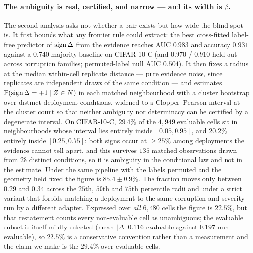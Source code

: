 \paragraph{The ambiguity is real, certified, and narrow --- and its width is $\beta$.} The second
analysis asks not whether a pair exists but how wide the blind spot is. It first bounds what any
frontier rule could extract: the best cross-fitted label-free predictor of $\operatorname{sign}\Delta$ from the
evidence reaches AUC $0.983$ and accuracy $0.931$ against a $0.740$ majority baseline on CIFAR-10-C
(and $0.970$ / $0.910$ held out across corruption families; permuted-label null AUC $0.504$). It
then fixes a radius at the median within-cell replicate distance --- pure evidence noise, since
replicates are independent draws of the same condition --- and estimates
$\mathbb{P}(\operatorname{sign}\Delta={+}1\mid Z\in N)$ in each matched neighbourhood with a cluster bootstrap over
distinct deployment conditions, widened to a Clopper--Pearson interval at the cluster count so that
neither ambiguity nor determinacy can be certified by a degenerate interval. On CIFAR-10-C,
$29.4\%$ of the $4{,}949$ evaluable cells sit in neighbourhoods whose
interval lies entirely inside $[0.05,0.95]$, and $20.2\%$ entirely inside $[0.25,0.75]$: both signs
occur at $\ge25\%$ among deployments the evidence cannot tell apart, and this survives $135$ matched
observations drawn from $28$ distinct conditions, so it is ambiguity in the conditional law and not
in the estimate. Under the same pipeline with the labels permuted and the geometry held fixed the
figure is $85.4\pm0.9\%$. The fraction moves only between $0.29$ and $0.34$ across the $25$th,
$50$th and $75$th percentile radii and under a strict variant that forbids matching a deployment to
the same corruption and severity run by a different adapter. Expressed over \emph{all} $6{,}480$
cells the figure is $22.5\%$, but that restatement counts every non-evaluable cell as unambiguous;
the evaluable subset is itself mildly selected (mean $|\Delta|$ $0.116$ evaluable against $0.197$
non-evaluable), so $22.5\%$ is a conservative convention rather than a measurement and the claim we
make is the $29.4\%$ over evaluable cells.

